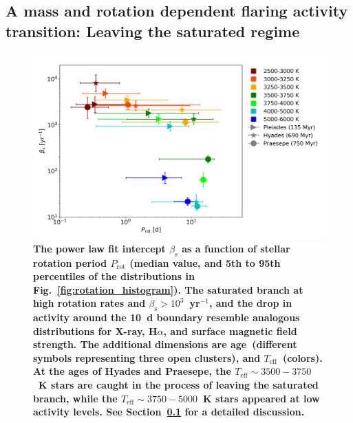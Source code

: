 \documentclass{aa}
\begin{document}
\subsection{A mass and rotation dependent flaring activity transition: Leaving the saturated regime}
\label{sec:4dim}
\begin{figure}[ht!]
    \centering
    \includegraphics[width=\hsize]{pics/FFDs/beta_T_age_rotation_full.png}
    \caption{\textbf{The power law fit intercept $\beta_\mathrm{s}$ as a function of stellar rotation period $P_\mathrm{rot}$ (median value, and 5th to 95th percentiles of the distributions in Fig.~\ref{fig:rotation_histogram}). The saturated branch at high rotation rates and $\beta_\mathrm{s}>10^3$~yr$^{-1}$, and the drop in activity around the 10~d boundary resemble analogous distributions for X-ray, H$\alpha$, and surface magnetic field strength. The additional dimensions are age~(different symbols representing three open clusters), and $T_\mathrm{eff}$~(colors). At the ages of Hyades and Praesepe, the $T_\mathrm{eff}\sim 3500-3750$~K stars are caught in the process of leaving the saturated branch, while the $T_\mathrm{eff}\sim 3750-5000$~K stars appeared at low activity levels. See Section~\ref{sec:4dim} for a detailed discussion.}}       
    \label{fig:4dim}
\end{figure}
\end{document}
